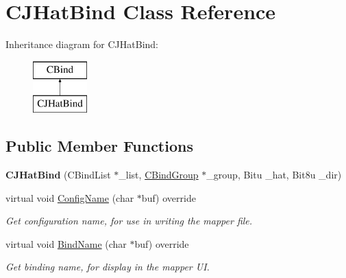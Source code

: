 \hypertarget{classCJHatBind}{\section{C\-J\-Hat\-Bind Class Reference}
\label{classCJHatBind}
}
Inheritance diagram for C\-J\-Hat\-Bind\-:\begin{figure}[H]
\begin{center}
\leavevmode
\includegraphics[height=2.000000cm]{classCJHatBind}
\end{center}
\end{figure}
\subsection*{Public Member Functions}
\begin{DoxyCompactItemize}
\item 
\hypertarget{classCJHatBind_af629c7834e53a8465c591e5547c5041e}{{\bfseries C\-J\-Hat\-Bind} (C\-Bind\-List $\ast$\-\_\-list, \hyperlink{classCBindGroup}{C\-Bind\-Group} $\ast$\-\_\-group, Bitu \-\_\-hat, Bit8u \-\_\-dir)}\label{classCJHatBind_af629c7834e53a8465c591e5547c5041e}

\item 
\hypertarget{classCJHatBind_a3380874d99f32a306b9253d5072ffd02}{virtual void \hyperlink{classCJHatBind_a3380874d99f32a306b9253d5072ffd02}{Config\-Name} (char $\ast$buf) override}\label{classCJHatBind_a3380874d99f32a306b9253d5072ffd02}

\begin{DoxyCompactList}\small\item\em Get configuration name, for use in writing the mapper file. \end{DoxyCompactList}\item 
\hypertarget{classCJHatBind_a560b88fbaed3fdff0c678262ac9963cf}{virtual void \hyperlink{classCJHatBind_a560b88fbaed3fdff0c678262ac9963cf}{Bind\-Name} (char $\ast$buf) override}\label{classCJHatBind_a560b88fbaed3fdff0c678262ac9963cf}

\begin{DoxyCompactList}\small\item\em Get binding name, for display in the mapper U\-I. \end{DoxyCompactList}\end{DoxyCompactItemize}
